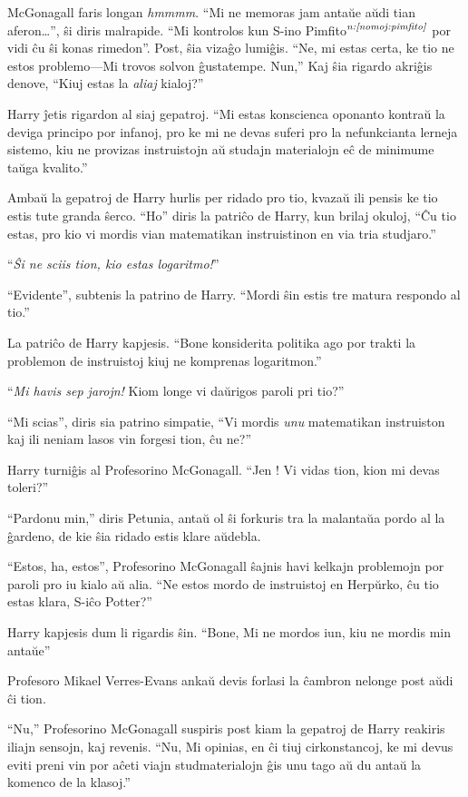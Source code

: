 McGonagall faris longan \emph{hmmmm}. ``Mi ne memoras jam antaŭe aŭdi
tian aferon\ldots{}'', ŝi diris malrapide. ``Mi kontrolos kun S-ino
Pimfito$^{\textit{n:\ref{nomoj:pimfito}}}$ por vidi ĉu ŝi konas rimedon''. Post,
ŝia vizaĝo lumiĝis. ``Ne, mi estas certa, ke tio ne estos problemo—Mi
trovos solvon ĝustatempe. Nun,'' Kaj ŝia rigardo akriĝis denove,
``Kiuj estas la \emph{aliaj} kialoj?''

Harry ĵetis rigardon al siaj gepatroj. ``Mi estas konscienca oponanto
kontraŭ la deviga principo por infanoj, pro ke mi ne devas suferi pro
la nefunkcianta lerneja sistemo, kiu ne provizas instruistojn aŭ
studajn materialojn eĉ de minimume taŭga kvalito.''

Ambaŭ la gepatroj de Harry hurlis per ridado pro tio, kvazaŭ ili
pensis ke tio estis tute granda ŝerco. ``Ho'' diris la patriĉo de Harry,
kun brilaj okuloj, ``Ĉu tio estas, pro kio vi mordis vian matematikan
instruistinon en via tria studjaro.''

``\emph{Ŝi ne sciis tion, kio estas logaritmo!}''

``Evidente'', subtenis la patrino de Harry. ``Mordi ŝin estis tre matura
respondo al tio.''

La patriĉo de Harry kapjesis. ``Bone konsiderita politika ago por trakti la
problemon de instruistoj kiuj ne komprenas logaritmon.''

``\emph{Mi havis sep jarojn!} Kiom longe vi daŭrigos paroli pri tio?''

``Mi scias'', diris sia patrino simpatie, ``Vi mordis \emph{unu} matematikan
instruiston kaj ili neniam lasos vin forgesi tion, ĉu ne?''

Harry turniĝis al Profesorino McGonagall. ``Jen ! Vi vidas tion, kion mi
devas toleri?''

``Pardonu min,'' diris Petunia, antaŭ ol ŝi forkuris tra la malantaŭa
pordo al la ĝardeno, de kie ŝia ridado estis klare aŭdebla.

``Estos, ha, estos'', Profesorino McGonagall ŝajnis havi kelkajn
problemojn por paroli pro iu kialo aŭ alia. ``Ne estos mordo de
instruistoj en Herpŭrko, ĉu tio estas klara, S-iĉo Potter?''

Harry kapjesis dum li rigardis ŝin. ``Bone, Mi ne mordos iun, kiu ne mordis min antaŭe''

Profesoro Mikael Verres-Evans ankaŭ devis forlasi la ĉambron nelonge post aŭdi ĉi tion.

``Nu,'' Profesorino McGonagall suspiris post kiam la gepatroj de Harry
reakiris iliajn sensojn, kaj revenis. ``Nu, Mi opinias, en ĉi tiuj
cirkonstancoj, ke mi devus eviti preni vin por aĉeti viajn
studmaterialojn ĝis unu tago aŭ du antaŭ la komenco de la klasoj.''

